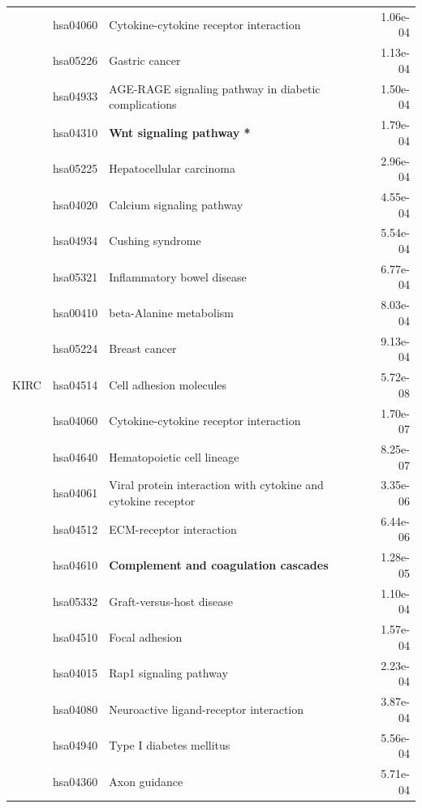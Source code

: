 \begin{longtable}{cllr}
 & hsa04060 & \textcolor{\clrnew}{Cytokine-cytokine receptor interaction} & 1.06e-04 \\ 
 & hsa05226 & \textcolor{\clrnew}{Gastric cancer} & 1.13e-04 \\ 
 & hsa04933 & \textcolor{\clrnew}{AGE-RAGE signaling pathway in diabetic complications} & 1.50e-04 \\ 
 & hsa04310 & \textcolor{\clrnew}{\textbf{Wnt signaling pathway *}} & 1.79e-04 \\ 
 & hsa05225 & \textcolor{\clrnew}{Hepatocellular carcinoma} & 2.96e-04 \\ 
 & hsa04020 & \textcolor{\clrnew}{Calcium signaling pathway} & 4.55e-04 \\ 
 & hsa04934 & \textcolor{\clrnew}{Cushing syndrome} & 5.54e-04 \\ 
 & hsa05321 & \textcolor{\clrnew}{Inflammatory bowel disease} & 6.77e-04 \\ 
 & hsa00410 & \textcolor{\clrnew}{beta-Alanine metabolism} & 8.03e-04 \\ 
 & hsa05224 & \textcolor{\clrnew}{Breast cancer} & 9.13e-04 \\ 
\midrule 
KIRC & hsa04514 & \textcolor{\clrnew}{Cell adhesion molecules} & 5.72e-08\\ 
 & hsa04060 & \textcolor{\clrnew}{Cytokine-cytokine receptor interaction} & 1.70e-07 \\ 
 & hsa04640 & \textcolor{\clrnew}{Hematopoietic cell lineage} & 8.25e-07 \\ 
 & hsa04061 & \textcolor{\clrnew}{Viral protein interaction with cytokine and cytokine receptor} & 3.35e-06 \\ 
 & hsa04512 & \textcolor{\clrnew}{ECM-receptor interaction} & 6.44e-06 \\ 
 \rowcolor{\clrpath}& hsa04610 & \textbf{Complement and coagulation cascades} & 1.28e-05 \\ 
 & hsa05332 & \textcolor{\clrnew}{Graft-versus-host disease} & 1.10e-04 \\ 
 & hsa04510 & \textcolor{\clrnew}{Focal adhesion} & 1.57e-04 \\ 
 & hsa04015 & \textcolor{\clrnew}{Rap1 signaling pathway} & 2.23e-04 \\ 
 & hsa04080 & \textcolor{\clrnew}{Neuroactive ligand-receptor interaction} & 3.87e-04 \\ 
 & hsa04940 & \textcolor{\clrnew}{Type I diabetes mellitus} & 5.56e-04 \\ 
 & hsa04360 & \textcolor{\clrnew}{Axon guidance} & 5.71e-04 \\ 

\end{longtable}
